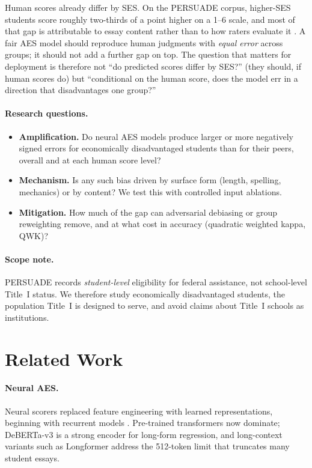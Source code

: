 \documentclass{article}
\begin{document}
Human scores already differ by SES. On the PERSUADE corpus, higher-SES students score roughly two-thirds of a point higher on a 1--6 scale, and most of that gap is attributable to essay content rather than to how raters evaluate it \citep{kunievsky2026content}. A fair AES model should reproduce human judgments with \emph{equal error} across groups; it should not add a further gap on top. The question that matters for deployment is therefore not ``do predicted scores differ by SES?'' (they should, if human scores do) but ``conditional on the human score, does the model err in a direction that disadvantages one group?''

\paragraph{Research questions.}
\begin{itemize}
  \item[\textbf{RQ1}] \textbf{Amplification.} Do neural AES models produce larger or more negatively signed errors for economically disadvantaged students than for their peers, overall and at each human score level?
  \item[\textbf{RQ2}] \textbf{Mechanism.} Is any such bias driven by surface form (length, spelling, mechanics) or by content? We test this with controlled input ablations.
  \item[\textbf{RQ3}] \textbf{Mitigation.} How much of the gap can adversarial debiasing or group reweighting remove, and at what cost in accuracy (quadratic weighted kappa, QWK)?
\end{itemize}

\paragraph{Scope note.} PERSUADE records \emph{student-level} eligibility for federal assistance, not school-level Title~I status. We therefore study economically disadvantaged students, the population Title~I is designed to serve, and avoid claims about Title~I schools as institutions.

\section{Related Work}
\label{sec:related}

\paragraph{Neural AES.} Neural scorers replaced feature engineering with learned representations, beginning with recurrent models \citep{taghipour2016neural}. Pre-trained transformers now dominate; DeBERTa-v3 \citep{he2023debertav3} is a strong encoder for long-form regression, and long-context variants such as Longformer \citep{beltagy2020longformer} address the 512-token limit that truncates many student essays.
\end{document}
